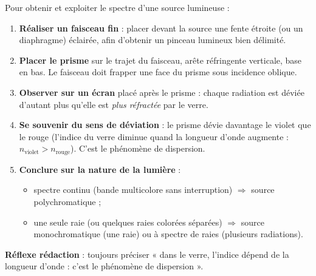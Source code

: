 \documentclass[11pt]{article}
\newcommand{\cle}[1]{{\popxbold\color{popdark}#1}}
\begin{document}
\begin{methode}
Pour obtenir et exploiter le spectre d'une source lumineuse :
\begin{enumerate}
\item \textbf{Réaliser un faisceau fin} : placer devant la source une fente étroite (ou un diaphragme) éclairée, afin d'obtenir un pinceau lumineux bien délimité.
\item \textbf{Placer le prisme} sur le trajet du faisceau, arête réfringente verticale, base en bas. Le faisceau doit frapper une face du prisme sous incidence oblique.
\item \textbf{Observer sur un écran} placé après le prisme : chaque radiation est déviée d'autant plus qu'elle est \emph{plus réfractée} par le verre.
\item \textbf{Se souvenir du sens de déviation} : le prisme dévie davantage le \cle{violet} que le \cle{rouge} (l'indice du verre diminue quand la longueur d'onde augmente : $n_{\text{violet}} > n_{\text{rouge}}$). C'est le phénomène de \cle{dispersion}.
\item \textbf{Conclure sur la nature de la lumière} :
\begin{itemize}
\item spectre \cle{continu} (bande multicolore sans interruption) $\Rightarrow$ source \cle{polychromatique} ;
\item une \cle{seule raie} (ou quelques raies colorées séparées) $\Rightarrow$ source monochromatique (une raie) ou à spectre de raies (plusieurs radiations).
\end{itemize}
\end{enumerate}
\textbf{Réflexe rédaction} : toujours préciser « dans le verre, l'indice dépend de la longueur d'onde : c'est le phénomène de \cle{dispersion} ».
\end{methode}
\end{document}

